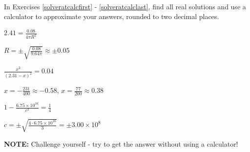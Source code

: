\documentclass{ximera}
\begin{document}
\begin{question}
In Exercises \ref{solveratcalcfirst} - \ref{solveratcalclast}, find all real solutions and use a calculator to approximate your answers, rounded to two decimal places.

\begin{problem}  \label{solveratcalcfirst}
$2.41 = \frac{0.08}{4 \pi R^2}$

\begin{solution}
$R = \pm \sqrt{\frac{0.08}{9.64 \pi}} \approx \pm 0.05$ 
\end{solution}
\end{problem}

\begin{problem}
$\frac{x^2}{(2.31 -x)^2} = 0.04$

\begin{solution}
$x = -\frac{231}{400} \approx -0.58$, $x = \frac{77}{200} \approx 0.38$ 
\end{solution}
\end{problem}

\begin{problem} \label{solveratcalclast}
$1 - \frac{6.75 \times 10^{16}}{c^2} = \frac{1}{4}$

\begin{solution}
$c = \pm \sqrt{\frac{4 \cdot 6.75 \times 10^{16}}{3}} = \pm 3.00 \times 10^{8}$ 

\textbf{NOTE:}  Challenge yourself - try to get the answer without using a calculator!
\end{solution}
\end{problem}

\end{question}
\end{document}
